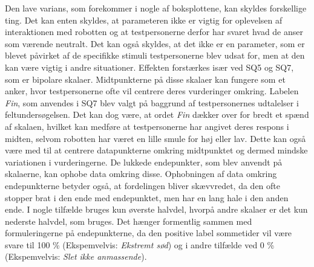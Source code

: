 Den lave varians, som forekommer i nogle af boksplottene, kan skyldes forskellige ting. Det kan enten skyldes, at parameteren ikke er vigtig for oplevelsen af interaktionen med robotten og at testpersonerne derfor har svaret hvad de anser som værende neutralt. Det kan også skyldes, at det ikke er en parameter, som er blevet påvirket af de specifikke stimuli testpersonerne blev udsat for, men at den kan være vigtig i andre situationer. Effekten forstærkes især ved SQ5 og SQ7, som er bipolare skalaer. Midtpunkterne på disse skalaer kan fungere som et anker, hvor testpersonerne ofte vil centrere deres vurderinger omkring. Labelen \textit{Fin}, som anvendes i SQ7 blev valgt på baggrund af testpersonernes udtalelser i feltundersøgelsen. Det kan dog være, at ordet \textit{Fin} dækker over for bredt et spænd af skalaen, hvilket kan medføre at testpersonerne har angivet deres respons i midten, selvom robotten har været en lille smule for høj eller lav. Dette kan også være med til at centrere datapunkterne omkring midtpunktet og dermed mindske variationen i vurderingerne. \blankline
%
De lukkede endepunkter, som blev anvendt på skalaerne, kan ophobe data omkring disse. Ophobningen af data omkring endepunkterne betyder også, at fordelingen bliver skævvredet, da den ofte stopper brat i den ende med endepunktet, men har en lang hale i den anden ende.  \blankline
%
I nogle tilfælde bruges kun øverste halvdel, hvorpå andre skalaer er det kun nederste halvdel, som bruges. Det hænger formentlig sammen med formuleringerne på endepunkterne, da den positive label sommetider vil være svare til 100 \% (Ekspemvelvis: \textit{Ekstremt sød}) og i andre tilfælde ved 0 \% (Ekspemvelvis: \textit{Slet ikke anmassende}).


